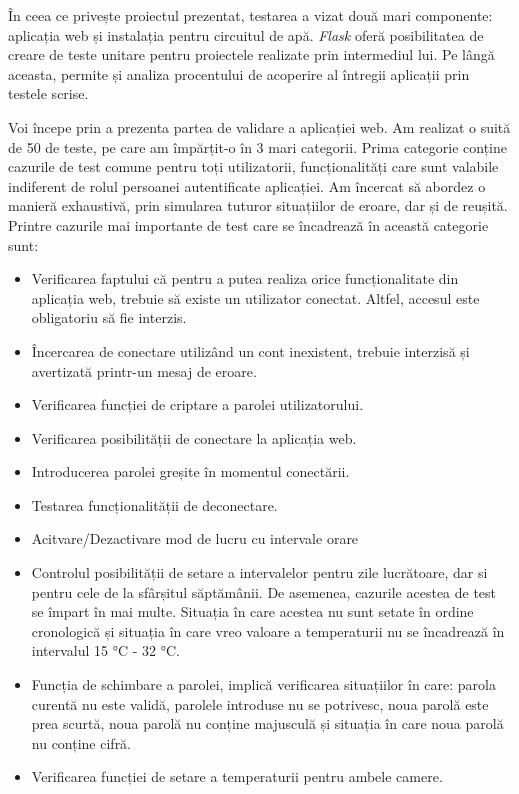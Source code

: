 	În ceea ce privește proiectul prezentat, testarea a vizat două mari componente: aplicația web și instalația pentru circuitul de apă. \textit{Flask} oferă posibilitatea de creare de teste unitare pentru proiectele realizate prin intermediul lui. Pe lângă aceasta, permite și analiza procentului de acoperire al întregii aplicații prin testele scrise.

	Voi începe prin a prezenta partea de validare a aplicației web. Am realizat o suită de 50 de teste, pe care am împărțit-o în 3 mari categorii. Prima categorie conține cazurile de test comune pentru toți utilizatorii, funcționalități care sunt valabile indiferent de rolul persoanei autentificate aplicației. Am încercat să abordez o manieră exhaustivă, prin simularea tuturor situațiilor de eroare, dar și de reușită. Printre cazurile mai importante de test care se încadrează în această categorie sunt:

	\begin{itemize}
			\setlength{\itemindent}{2em}
			\itemsep0em
			\item Verificarea faptului că pentru a putea realiza orice funcționalitate din aplicația web, trebuie să existe un utilizator conectat. Altfel, accesul este obligatoriu să fie interzis.
			\item Încercarea de conectare utilizând un cont inexistent, trebuie interzisă și avertizată printr-un mesaj de eroare.
			\item Verificarea funcției de criptare a parolei utilizatorului.
			\item Verificarea posibilității de conectare la aplicația web.
			\item Introducerea parolei greșite în momentul conectării.
			\item Testarea funcționalității de deconectare.
			\item Acitvare/Dezactivare mod de lucru cu intervale orare
			\item Controlul posibilității de setare a intervalelor pentru zile lucrătoare, dar si pentru cele de la sfârșitul săptămânii. De asemenea, cazurile acestea de test se împart în mai multe. Situația în care acestea nu sunt setate în ordine cronologică și situația în care vreo valoare a temperaturii nu se încadrează în intervalul 15 °C - 32 °C.
			\item Funcția de schimbare a parolei, implică verificarea situațiilor în care: parola curentă nu este validă, parolele introduse nu se potrivesc, noua parolă este prea scurtă, noua parolă nu conține majusculă și situația în care noua parolă nu conține cifră.
			\item Verificarea funcției de setare a temperaturii pentru ambele camere.
	\end{itemize} 

